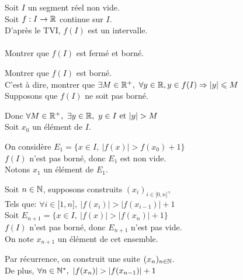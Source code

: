 \documentclass[12pt,twoside,a4paper]{article}
\begin{document}
		\begin{preuve}
			Soit $I$ un segment réel non vide.\\
			Soit $f:I\rightarrow \mathbb{R}$ continue sur $I$.\\
			D'apr\`es le TVI, $f(I)$ est un intervalle.\\
			\\
			Montrer que $f(I)$ est fermé et borné.
			\begin{liste}
				\item[\cercle1] Montrer que $f(I)$ est borné.\\
					C'est \`a dire, montrer que $\exists M\in\mathbb{R}^{+},\ \forall y\in\mathbb{R}, y\in f(I)\Rightarrow |y|\leqslant M$\\
					 Supposons que $f(I)$ ne soit pas borné.
					\begin{tab}
						Donc $\forall M\in\R^{+},\ \exists y\in\R,\ y\in I\et |y|> M$\\
						Soit $x_0$ un élément de $I$.
						\begin{liste}
							\item On considère $E_1=\{x\in I,\ |f(x)|>f(x_0)+1 \}$\\
								$f(I)$ n'est pas borné, donc $E_1$ est non vide.\\
								Notons $x_1$ un élément de $E_1$.
							\item Soit $n\in\mathbb{N}$, supposons construits $(x_i)_{i\in\lbrack0,n\rbrack}$,\\
								Tels que: $\forall i\in\lbrack1,n\rbrack,\ |f(x_i)|>|f(x_{i-1})|+1$\\
								Soit $E_{n+1}=\{x\in I,\ |f(x)|>|f(x_n)|+1 \}$\\
								$f(I)$ n'est pas borné, donc $E_{n+1}$ n'est pas vide.\\
								On note $x_{n+1}$ un élément de cet ensemble.
							\item Par récurrence, on construit une suite $(x_n)_{n\in \mathbb{N}}$.\\
							De plus, $\forall n\in\N^{*},\ |f(x_n)|>|f(x_{n-1})|+1$ %
						\end{liste}
					\end{tab}
			\end{liste}
		\end{preuve}
\end{document}
